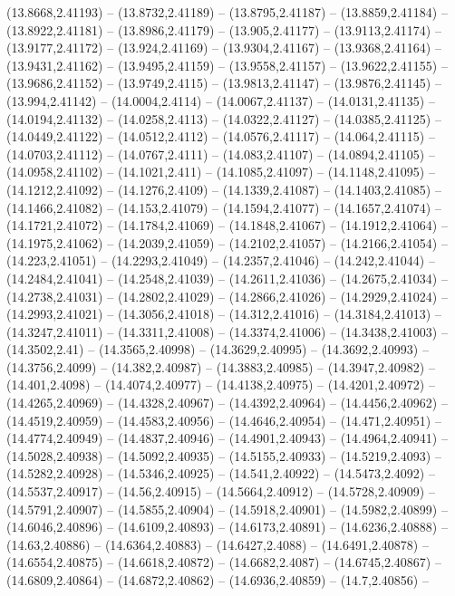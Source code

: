{(13.8668,2.41193) -- (13.8732,2.41189) -- (13.8795,2.41187) -- (13.8859,2.41184) -- (13.8922,2.41181) -- (13.8986,2.41179) -- (13.905,2.41177) -- (13.9113,2.41174) -- (13.9177,2.41172) -- (13.924,2.41169) -- (13.9304,2.41167) -- (13.9368,2.41164) --
(13.9431,2.41162) -- (13.9495,2.41159) -- (13.9558,2.41157) -- (13.9622,2.41155) -- (13.9686,2.41152) -- (13.9749,2.4115) -- (13.9813,2.41147) -- (13.9876,2.41145) -- (13.994,2.41142) -- (14.0004,2.4114) -- (14.0067,2.41137) -- (14.0131,2.41135) --
(14.0194,2.41132) -- (14.0258,2.4113) -- (14.0322,2.41127) -- (14.0385,2.41125) -- (14.0449,2.41122) -- (14.0512,2.4112) -- (14.0576,2.41117) -- (14.064,2.41115) -- (14.0703,2.41112) -- (14.0767,2.4111) -- (14.083,2.41107) -- (14.0894,2.41105) --
(14.0958,2.41102) -- (14.1021,2.411) -- (14.1085,2.41097) -- (14.1148,2.41095) -- (14.1212,2.41092) -- (14.1276,2.4109) -- (14.1339,2.41087) -- (14.1403,2.41085) -- (14.1466,2.41082) -- (14.153,2.41079) -- (14.1594,2.41077) -- (14.1657,2.41074) --
(14.1721,2.41072) -- (14.1784,2.41069) -- (14.1848,2.41067) -- (14.1912,2.41064) -- (14.1975,2.41062) -- (14.2039,2.41059) -- (14.2102,2.41057) -- (14.2166,2.41054) -- (14.223,2.41051) -- (14.2293,2.41049) -- (14.2357,2.41046) -- (14.242,2.41044) --
(14.2484,2.41041) -- (14.2548,2.41039) -- (14.2611,2.41036) -- (14.2675,2.41034) -- (14.2738,2.41031) -- (14.2802,2.41029) -- (14.2866,2.41026) -- (14.2929,2.41024) -- (14.2993,2.41021) -- (14.3056,2.41018) -- (14.312,2.41016) -- (14.3184,2.41013)
-- (14.3247,2.41011) -- (14.3311,2.41008) -- (14.3374,2.41006) -- (14.3438,2.41003) -- (14.3502,2.41) -- (14.3565,2.40998) -- (14.3629,2.40995) -- (14.3692,2.40993) -- (14.3756,2.4099) -- (14.382,2.40987) -- (14.3883,2.40985) -- (14.3947,2.40982) --
(14.401,2.4098) -- (14.4074,2.40977) -- (14.4138,2.40975) -- (14.4201,2.40972) -- (14.4265,2.40969) -- (14.4328,2.40967) -- (14.4392,2.40964) -- (14.4456,2.40962) -- (14.4519,2.40959) -- (14.4583,2.40956) -- (14.4646,2.40954) -- (14.471,2.40951) --
(14.4774,2.40949) -- (14.4837,2.40946) -- (14.4901,2.40943) -- (14.4964,2.40941) -- (14.5028,2.40938) -- (14.5092,2.40935) -- (14.5155,2.40933) -- (14.5219,2.4093) -- (14.5282,2.40928) -- (14.5346,2.40925) -- (14.541,2.40922) -- (14.5473,2.4092) --
(14.5537,2.40917) -- (14.56,2.40915) -- (14.5664,2.40912) -- (14.5728,2.40909) -- (14.5791,2.40907) -- (14.5855,2.40904) -- (14.5918,2.40901) -- (14.5982,2.40899) -- (14.6046,2.40896) -- (14.6109,2.40893) -- (14.6173,2.40891) -- (14.6236,2.40888) --
(14.63,2.40886) -- (14.6364,2.40883) -- (14.6427,2.4088) -- (14.6491,2.40878) -- (14.6554,2.40875) -- (14.6618,2.40872) -- (14.6682,2.4087) -- (14.6745,2.40867) -- (14.6809,2.40864) -- (14.6872,2.40862) -- (14.6936,2.40859) -- (14.7,2.40856) --
}
